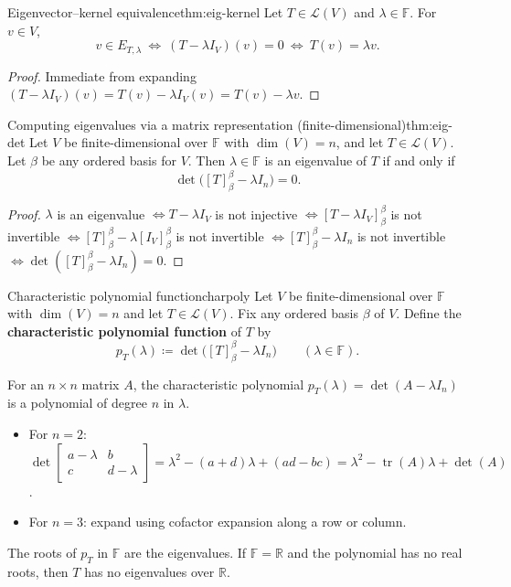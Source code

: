 \begin{theorem}{Eigenvector--kernel equivalence}{thm:eig-kernel}
Let $T\in\mathcal{L}(V)$ and $\lambda\in\mathbb{F}$. For $v\in V$,
\[
v\in E_{T,\lambda}\ \Longleftrightarrow\ (T-\lambda I_V)(v)=0\ \Longleftrightarrow\ T(v)=\lambda v.
\]
\end{theorem}

\begin{proof}
Immediate from expanding $(T-\lambda I_V)(v)=T(v)-\lambda I_V(v)=T(v)-\lambda v$.
\end{proof}

\begin{theorem}{Computing eigenvalues via a matrix representation (finite-dimensional)}{thm:eig-det}
Let $V$ be finite-dimensional over $\mathbb{F}$ with $\dim(V)=n$, and let $T\in\mathcal{L}(V)$.
Let $\beta$ be any ordered basis for $V$.
Then $\lambda\in\mathbb{F}$ is an eigenvalue of $T$ if and only if
\[
\det\bigl([T]^{\beta}_{\beta}-\lambda I_n\bigr)=0.
\]
\end{theorem}

\begin{proof}
$\lambda$ is an eigenvalue $\Longleftrightarrow T-\lambda I_V$ is not injective
$\Longleftrightarrow [T-\lambda I_V]^{\beta}_{\beta}$ is not invertible
$\Longleftrightarrow [T]^{\beta}_{\beta}-\lambda[I_V]^{\beta}_{\beta}$ is not invertible
$\Longleftrightarrow [T]^{\beta}_{\beta}-\lambda I_n$ is not invertible
$\Longleftrightarrow \det([T]^{\beta}_{\beta}-\lambda I_n)=0$.
\end{proof}

\begin{definition}{Characteristic polynomial function}{charpoly}
Let $V$ be finite-dimensional over $\mathbb{F}$ with $\dim(V)=n$ and let $T\in\mathcal{L}(V)$.
Fix any ordered basis $\beta$ of $V$.
Define the \textbf{characteristic polynomial function} of $T$ by
\[
p_T(\lambda)\coloneqq \det\bigl([T]^{\beta}_{\beta}-\lambda I_n\bigr)\qquad(\lambda\in\mathbb{F}).
\]

\end{definition}

For an $n\times n$ matrix $A$, the characteristic polynomial $p_T(\lambda)=\det(A-\lambda I_n)$ is a polynomial of degree $n$ in $\lambda$.
\begin{itemize}
\item For $n=2$: $\det\begin{bmatrix}a-\lambda&b\\c&d-\lambda\end{bmatrix}=\lambda^2-(a+d)\lambda+(ad-bc)=\lambda^2-\operatorname{tr}(A)\lambda+\det(A)$.
\item For $n=3$: expand using cofactor expansion along a row or column.
\end{itemize}
The roots of $p_T$ in $\mathbb{F}$ are the eigenvalues. If $\mathbb{F}=\mathbb{R}$ and the polynomial has no real roots, then $T$ has no eigenvalues over $\mathbb{R}$.

